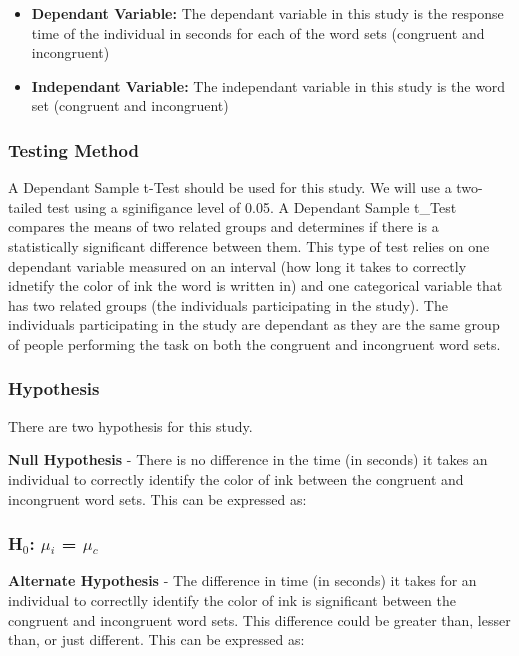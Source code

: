 \documentclass[11pt]{article}
\begin{document}
    \begin{itemize}
\item
  \textbf{Dependant Variable:} The dependant variable in this study is
  the response time of the individual in seconds for each of the word
  sets (congruent and incongruent)
\item
  \textbf{Independant Variable:} The independant variable in this study
  is the word set (congruent and incongruent)
\end{itemize}

    \subsubsection{Testing Method}\label{testing-method}

A Dependant Sample t-Test should be used for this study. We will use a
two-tailed test using a sginifigance level of 0.05. A Dependant Sample
t\_Test compares the means of two related groups and determines if there
is a statistically significant difference between them. This type of
test relies on one dependant variable measured on an interval (how long
it takes to correctly idnetify the color of ink the word is written in)
and one categorical variable that has two related groups (the
individuals participating in the study). The individuals participating
in the study are dependant as they are the same group of people
performing the task on both the congruent and incongruent word sets.

    \subsubsection{Hypothesis}\label{hypothesis}

There are two hypothesis for this study.

\textbf{Null Hypothesis} - There is no difference in the time (in
seconds) it takes an individual to correctly identify the color of ink
between the congruent and incongruent word sets. This can be expressed
as:

\subsubsection{\texorpdfstring{\textbf{H\(_{0}\): \(\mu\)\(_{i}\) =
\(\mu\)\(_{c}\)}}{H\_\{0\}: \textbackslash{}mu\_\{i\} = \textbackslash{}mu\_\{c\}}}\label{h_0-mu_i-mu_c}

\textbf{Alternate Hypothesis} - The difference in time (in seconds) it
takes for an individual to correctlly identify the color of ink is
significant between the congruent and incongruent word sets. This
difference could be greater than, lesser than, or just different. This
can be expressed as:
\end{document}
